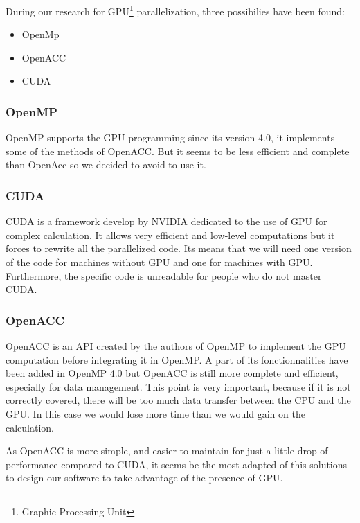 During our research for GPU\footnote{Graphic Processing Unit} parallelization, three possibilies have been found:
\begin{itemize}
\item OpenMp
\item OpenACC
\item CUDA
\end{itemize}


\subsubsection{OpenMP}
OpenMP supports the GPU programming since its version 4.0, it implements some of the methods of OpenACC. But it seems to be less efficient and complete than OpenAcc so we decided to avoid to use it.

\subsubsection{CUDA}
CUDA is a framework develop by NVIDIA dedicated to the use of GPU for complex calculation. It allows very efficient and low-level computations but it forces to rewrite all the parallelized code. Its means that we will need one version of the code for machines without GPU and one for machines with GPU. Furthermore, the specific code is unreadable for people who do not master CUDA.

\subsubsection{OpenACC}
OpenACC is an API created by the authors of OpenMP to implement the GPU computation before integrating it in OpenMP. A part of its fonctionnalities have been added in OpenMP 4.0 but OpenACC is still more complete and efficient, especially for data management. This point is very important, because if it is not correctly covered, there will be too much data transfer between the CPU and the GPU. In this case we would lose more time than we would gain on the calculation. 

As OpenACC is more simple, and easier to maintain for just a little drop of performance compared to CUDA, it seems be the most adapted of this solutions to design our software to take advantage of the presence of GPU.